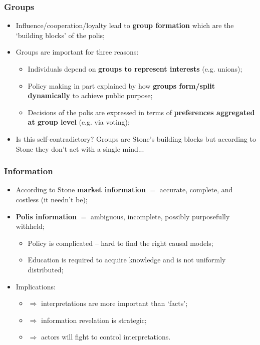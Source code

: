 \documentclass[aspectratio=169]{beamer}
\theoremstyle{principle}
\begin{document}
\begin{frame}
\frametitle{Groups}
\begin{itemize}
\item Influence/cooperation/loyalty lead to \textbf{group formation} which are the `building blocks' of the polis;
\bigskip
\bigskip
\item Groups are important for three reasons:
\begin{itemize}
\item Individuals depend on \textbf{groups to represent interests} (e.g. unions);
\item Policy making in part explained by how \textbf{groups form/split dynamically} to achieve public purpose;
\item Decisions of the polis are expressed in terms of \textbf{preferences aggregated at group level} (e.g. via voting);
\end{itemize}
\bigskip
\bigskip
\item Is this self-contradictory?  Groups are Stone's building blocks but according to Stone they don't act with a single mind...
\end{itemize}
\end{frame}

\begin{frame}
\frametitle{Information}
\begin{itemize}
\item According to Stone \textbf{market information} $=$ accurate, complete, and costless (it needn't be);
\bigskip
\bigskip
\item \textbf{Polis information} $=$ ambiguous, incomplete, possibly purposefully withheld;
\begin{itemize}
\item Policy is complicated -- hard to find the right causal models;
\item Education is required to acquire knowledge and is not uniformly distributed;
\end{itemize}
\bigskip
\bigskip
\item Implications:
\begin{itemize}
\item $\Rightarrow$ interpretations are more important than `facts';
\item $\Rightarrow$ information revelation is strategic;
\item $\Rightarrow$ actors will fight to control interpretations.
\end{itemize}
\end{itemize}
\end{frame}
\end{document}
